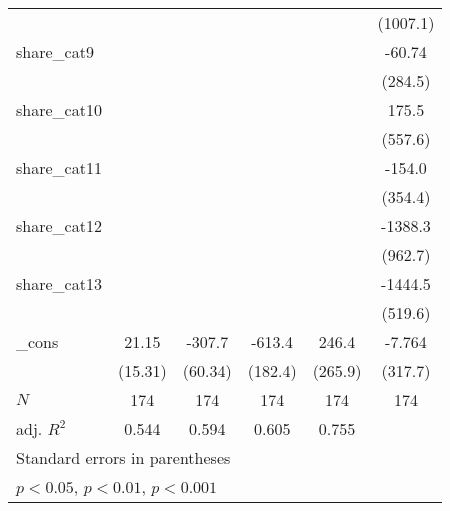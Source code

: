 {\begin{tabular}{l*{5}{c}}
            &                     &                     &                     &                     &    (1007.1)         \\
[1em]
share\_cat9  &                     &                     &                     &                     &      -60.74         \\
            &                     &                     &                     &                     &     (284.5)         \\
[1em]
share\_cat10 &                     &                     &                     &                     &       175.5         \\
            &                     &                     &                     &                     &     (557.6)         \\
[1em]
share\_cat11 &                     &                     &                     &                     &      -154.0         \\
            &                     &                     &                     &                     &     (354.4)         \\
[1em]
share\_cat12 &                     &                     &                     &                     &     -1388.3         \\
            &                     &                     &                     &                     &     (962.7)         \\
[1em]
share\_cat13 &                     &                     &                     &                     &     -1444.5\sym{**} \\
            &                     &                     &                     &                     &     (519.6)         \\
[1em]
\_cons      &       21.15         &      -307.7\sym{***}&      -613.4\sym{***}&       246.4         &      -7.764         \\
            &     (15.31)         &     (60.34)         &     (182.4)         &     (265.9)         &     (317.7)         \\
\hline
\(N\)       &         174         &         174         &         174         &         174         &         174         \\
adj. \(R^{2}\)&       0.544         &       0.594         &       0.605         &       0.755         &                     \\
\hline\hline
\multicolumn{6}{l}{\footnotesize Standard errors in parentheses}\\
\multicolumn{6}{l}{\footnotesize \sym{*} \(p<0.05\), \sym{**} \(p<0.01\), \sym{***} \(p<0.001\)}\\
\end{tabular}
}
